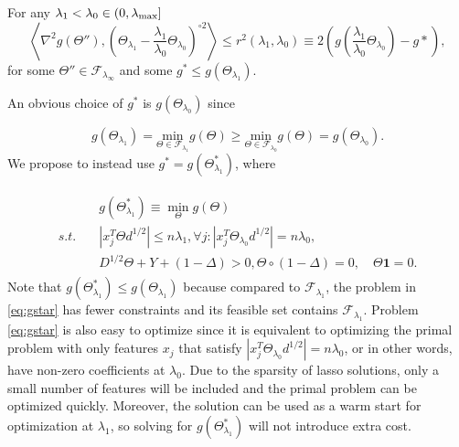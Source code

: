 \begin{theorem}
    \label{thm:1}
    For any $\lambda_1<\lambda_{0}\in (0,\lambda_\textnormal{max}]$ 
    \begin{equation}
        \left\langle\nabla^2 g(\Theta''),\left(\Theta_{\lambda_1}-\frac{\lambda_1}{\lambda_0}\Theta_{\lambda_0}\right)^{\circ 2}\right\rangle\leq r^2(\lambda_1,\lambda_0)\equiv 2\left(g\left(\frac{\lambda_1}{\lambda_0}\Theta_{\lambda_0}\right)-g*\right),
    \end{equation}
    for some $\Theta''\in\mathcal{F}_{\lambda_{\infty}}$ and some $g^*\leq g(\Theta_{\lambda_1})$.
\end{theorem}

An obvious choice of $g^*$ is $g(\Theta_{\lambda_0})$ since

\begin{equation*}
  g(\Theta_{\lambda_1}) = \underset{\Theta\in \mathcal{F}_{\lambda_1}}{\mathrm{min}}g(\Theta)\geq\underset{\Theta\in \mathcal{F}_{\lambda_0}}{\mathrm{min}}g(\Theta) = g\left(\Theta_{\lambda_0}\right).
\end{equation*}
We propose to instead use $g^* = g(\Theta^*_{\lambda_1})$, where

\begin{gather}
    \label{eq:gstar}
    \begin{aligned}
        &g(\Theta^*_{\lambda_1}) \equiv \min_\Theta g(\Theta)\\
        s.t.\quad &|x_j^T\Theta d^{1/2}|\leq n\lambda_1,\forall j:|x_j^T\Theta_{\lambda_0} d^{1/2}|= n\lambda_0,\\&D^{1/2}\Theta+Y+(1-\Delta)> 0, \Theta\circ(1-\Delta)=0,\quad \Theta\mathbf{1}=0.
    \end{aligned}
\end{gather}
Note that $g(\Theta^*_{\lambda_1}) \leq g(\Theta_{\lambda_1})$ because compared to $\mathcal{F}_{\lambda_1}$, the problem in \eqref{eq:gstar} has fewer constraints and its feasible set contains $\mathcal{F}_{\lambda_1}$. Problem \eqref{eq:gstar} is also easy to optimize since it is equivalent to optimizing the primal problem with only features $x_j$ that satisfy $|x_j^T\Theta_{\lambda_0} d^{1/2}|= n\lambda_0$, or in other words, have non-zero coefficients at $\lambda_0$. Due to the sparsity of lasso solutions, only a small number of features will be included and the primal problem can be optimized quickly. Moreover, the solution can be used as a warm start for optimization at $\lambda_1$, so solving for $g(\Theta^*_{\lambda_1})$ will not introduce extra cost. 

